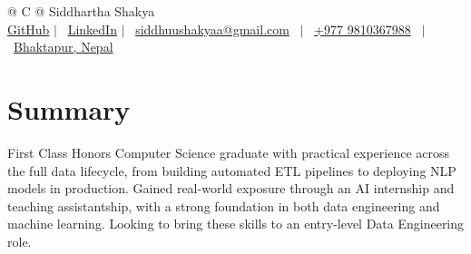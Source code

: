 \documentclass[a4paper,11pt]{article}
\begin{document}
\pagestyle{empty} 



\begin{tabularx}{\linewidth}{@{} C @{}} 
\Huge{Siddhartha Shakya} \\[3pt]
\href{https://github.com/SiddhuShkya}{GitHub} $|$ \ 
\href{https://www.linkedin.com/in/sidShkya/}{LinkedIn} $|$ \
\href{mailto:siddhuushakyaa@gmail.com}{siddhuushakyaa@gmail.com} \ $|$ \ 
\href{tel:+9779810367988}{+977 9810367988} \ $|$ \ 
\href{https://maps.google.com/?q=International+City,+Dubai}{Bhaktapur, Nepal} \\
\end{tabularx}


\section{Summary}
First Class Honors Computer Science graduate with practical experience across the full data lifecycle, from building automated ETL pipelines to deploying NLP models in production. Gained real-world exposure through an
AI internship and teaching assistantship, with a strong foundation in both data engineering and machine
learning. Looking to bring these skills to an entry-level Data Engineering role.

\end{document}
